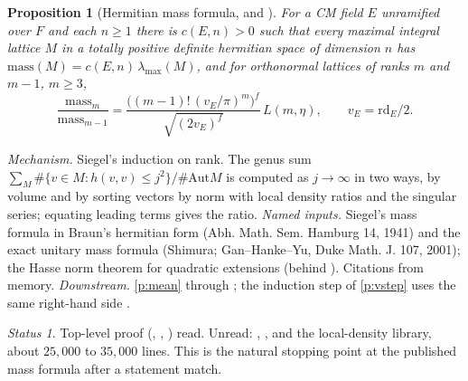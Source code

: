 \documentclass[11pt]{article}
\newcommand{\rd}{\mathrm{rd}}
\newtheorem{prop}{Proposition}
\theoremstyle{remark}
\newtheorem*{status}{Status}
\begin{document}
\begin{prop}[Hermitian mass formula,  and ]\label{p:mass}
For a CM field $E$ unramified over $F$ and each $n\ge1$ there is $c(E,n)>0$ such that every maximal integral lattice $M$ in a totally positive definite hermitian space of dimension $n$ has $\mathrm{mass}(M)=c(E,n)\,\lambda_{\max}(M)$, and for orthonormal lattices of ranks $m$ and $m-1$, $m\ge3$,
\[
\frac{\mathrm{mass}_m}{\mathrm{mass}_{m-1}}=\frac{\bigl((m-1)!\,(v_E/\pi)^m\bigr)^{f}}{\sqrt{(2v_E)^{f}}}\,L(m,\eta),\qquad v_E=\rd_E/2 .
\]
\end{prop}
\emph{Mechanism.} Siegel's induction on rank. The genus sum $\sum_M\#\{v\in M:h(v,v)\le j^2\}/\#\mathrm{Aut}M$ is computed as $j\to\infty$ in two ways, by volume and by sorting vectors by norm with local density ratios and the singular series; equating leading terms gives the ratio.
\emph{Named inputs.} Siegel's mass formula in Braun's hermitian form (Abh. Math. Sem. Hamburg 14, 1941) and the exact unitary mass formula (Shimura; Gan--Hanke--Yu, Duke Math. J. 107, 2001); the Hasse norm theorem for quadratic extensions (behind ). Citations from memory.
\emph{Downstream.} \ref{p:mean} through ; the induction step of \ref{p:vstep} uses the same right-hand side .
\begin{status}Top-level proof (, , ) read. Unread: , ,  and the local-density library, about $25{,}000$ to $35{,}000$ lines. This is the natural stopping point at the published mass formula after a statement match.\end{status}
\end{document}
